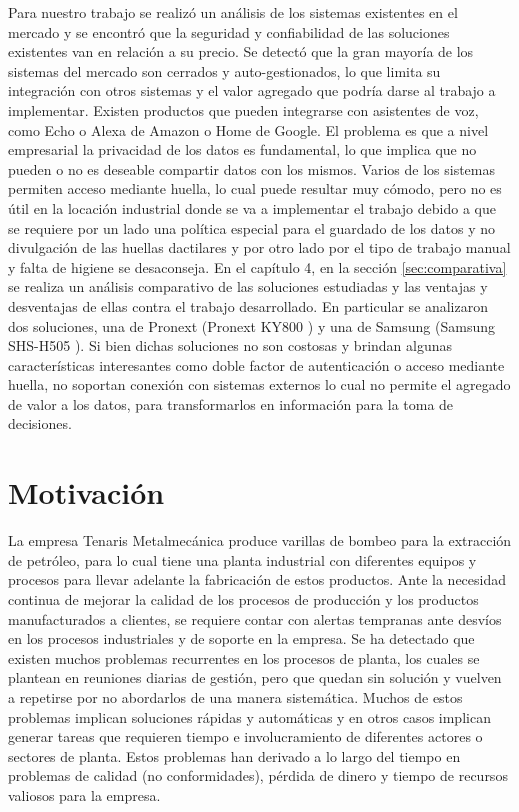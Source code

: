 Para nuestro trabajo se realizó un análisis de los sistemas existentes en el mercado y se encontró que la seguridad y confiabilidad de las soluciones existentes van en relación a su precio. Se detectó que la gran mayoría de los sistemas del mercado son cerrados y auto-gestionados, lo que limita su integración con otros sistemas y el valor agregado que podría darse al trabajo a implementar. Existen productos que pueden integrarse con asistentes de voz, como Echo o Alexa de Amazon o Home de Google. El problema es que a nivel empresarial la privacidad de los datos es fundamental, lo que implica que no pueden o no es deseable compartir datos con los mismos. Varios de los sistemas permiten acceso mediante huella, lo cual puede resultar muy cómodo, pero no es útil en la locación industrial donde se va a implementar el trabajo debido a que se requiere por un lado una política especial para el guardado de los datos y no divulgación de las huellas dactilares y por otro lado por el tipo de trabajo manual y falta de higiene se desaconseja. En el capítulo 4, en la sección \ref{sec:comparativa} se realiza un análisis comparativo de las soluciones estudiadas y las ventajas y desventajas de ellas contra el trabajo desarrollado. En particular se analizaron dos soluciones, una de Pronext (Pronext KY800 \citep{WEBSITE:Ponext}) y una de Samsung (Samsung SHS-H505 \citep{WEBSITE:Samsung}). Si bien dichas soluciones no son costosas y brindan algunas características interesantes como doble factor de autenticación o acceso mediante huella, no soportan conexión con sistemas externos lo cual no permite el agregado de valor a los datos, para transformarlos en información para la toma de decisiones. 



\section{Motivación}

La empresa Tenaris Metalmecánica produce varillas de bombeo para la extracción de petróleo, para lo cual tiene una planta industrial con diferentes equipos y procesos para llevar adelante la fabricación de estos productos. Ante la necesidad continua de mejorar la calidad de los procesos de producción y los productos manufacturados a clientes, se requiere contar con alertas tempranas ante desvíos en los procesos industriales y de soporte en la empresa. Se ha detectado que existen muchos problemas recurrentes en los procesos de planta, los cuales se plantean en reuniones diarias de gestión, pero que quedan sin solución y vuelven a repetirse por no abordarlos de una manera sistemática. Muchos de estos problemas implican soluciones rápidas y automáticas y en otros casos implican generar tareas que requieren tiempo e involucramiento de diferentes actores o sectores de planta. Estos problemas han derivado a lo largo del tiempo en problemas de calidad (no conformidades), pérdida de dinero y tiempo de recursos valiosos para la empresa. 

